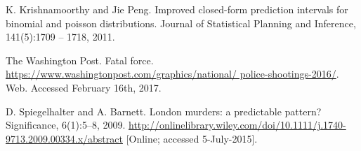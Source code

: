 \documentclass[12pt, titlepage]{article}
\begin{document}
\pagebreak

\begin{thebibliography}{9}
\raggedright

K. Krishnamoorthy and Jie Peng. Improved closed-form prediction intervals for binomial and poisson distributions. Journal of Statistical Planning and Inference, 141(5):1709 – 1718, 2011.

The Washington Post. Fatal force. \url{https://www.washingtonpost.com/graphics/national/ police-shootings-2016/}. Web. Accessed February 16th, 2017.

D. Spiegelhalter and A. Barnett. London murders: a predictable pattern? Significance, 6(1):5–8, 2009. \url{http://onlinelibrary.wiley.com/doi/10.1111/j.1740-9713.2009.00334.x/abstract} [Online; accessed 5-July-2015].

\end{thebibliography}





\end{document}
